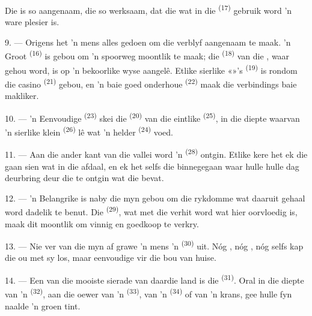 Die  is so aangenaam, die  so werksaam, dat die
 wat in die  \textsuperscript{(17)} gebruik word 'n ware
plesier is.

\VUsaut{3.0mm}
\VUsaut{3.0mm}

9. --- Origens het 'n mens alles gedoen om die verblyf aangenaam te maak. 'n Groot
 \textsuperscript{(16)} is gebou om 'n spoorweg moontlik te maak; die
 \textsuperscript{(18)} van die , waar
 gehou word, is op 'n bekoorlike wyse aangelê. Etlike sierlike
«»'s \textsuperscript{(19)} is rondom die casino \textsuperscript{(21)}
gebou, en 'n baie goed onderhoue  \textsuperscript{(22)} maak die
verbindings baie makliker.

10. --- 'n Eenvoudige  \textsuperscript{(23)} skei die 
\textsuperscript{(20)} van die eintlike  \textsuperscript{(25)}, in die
diepte waarvan 'n sierlike klein  \textsuperscript{(26)} lê wat 'n helder
 \textsuperscript{(24)} voed.

11. --- Aan die ander kant van die vallei word 'n 
\textsuperscript{(28)} ontgin. Etlike kere het ek die  gaan sien wat
in die  afdaal, en ek het selfs die  binnegegaan waar hulle
hulle dag deurbring deur die  te ontgin wat die  bevat.

12. --- 'n Belangrike  is naby die myn gebou om die rykdomme wat daaruit
gehaal word dadelik te benut. Die  \textsuperscript{(29)}, wat met die
 verhit word wat hier oorvloedig is, maak dit moontlik om vinnig en
goedkoop  te verkry.

13. --- Nie ver van die myn af grawe 'n mens 'n 
\textsuperscript{(30)} uit. Nóg , nóg , nóg selfs
 kap die ou  met sy  los, maar
eenvoudige  vir die bou van huise.

14. --- Een van die mooiste sierade van daardie land is die 
\textsuperscript{(31)}. Oral in die diepte van 'n  \textsuperscript{(32)},
aan die oewer van 'n  \textsuperscript{(33)}, van 'n 
\textsuperscript{(34)} of van 'n krans, gee hulle fyn naalde 'n groen tint.

